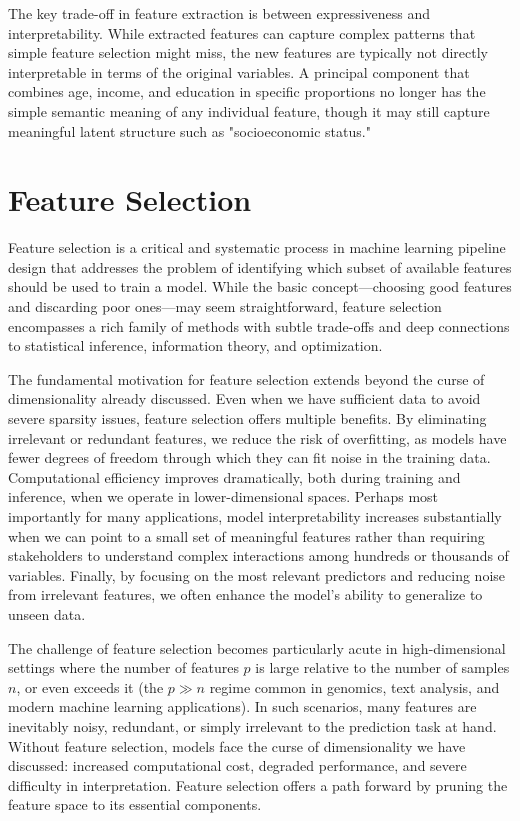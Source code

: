 The key trade-off in feature extraction is between expressiveness and interpretability. While extracted features can capture complex patterns that simple feature selection might miss, the new features are typically not directly interpretable in terms of the original variables. A principal component that combines age, income, and education in specific proportions no longer has the simple semantic meaning of any individual feature, though it may still capture meaningful latent structure such as "socioeconomic status."

\section*{Feature Selection}

Feature selection is a critical and systematic process in machine learning pipeline design that addresses the problem of identifying which subset of available features should be used to train a model. While the basic concept—choosing good features and discarding poor ones—may seem straightforward, feature selection encompasses a rich family of methods with subtle trade-offs and deep connections to statistical inference, information theory, and optimization.

The fundamental motivation for feature selection extends beyond the curse of dimensionality already discussed. Even when we have sufficient data to avoid severe sparsity issues, feature selection offers multiple benefits. By eliminating irrelevant or redundant features, we reduce the risk of overfitting, as models have fewer degrees of freedom through which they can fit noise in the training data. Computational efficiency improves dramatically, both during training and inference, when we operate in lower-dimensional spaces. Perhaps most importantly for many applications, model interpretability increases substantially when we can point to a small set of meaningful features rather than requiring stakeholders to understand complex interactions among hundreds or thousands of variables. Finally, by focusing on the most relevant predictors and reducing noise from irrelevant features, we often enhance the model's ability to generalize to unseen data.

The challenge of feature selection becomes particularly acute in high-dimensional settings where the number of features $p$ is large relative to the number of samples $n$, or even exceeds it (the $p \gg n$ regime common in genomics, text analysis, and modern machine learning applications). In such scenarios, many features are inevitably noisy, redundant, or simply irrelevant to the prediction task at hand. Without feature selection, models face the curse of dimensionality we have discussed: increased computational cost, degraded performance, and severe difficulty in interpretation. Feature selection offers a path forward by pruning the feature space to its essential components.

